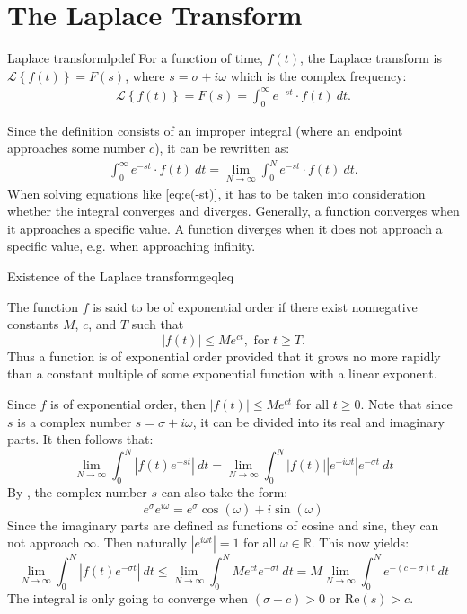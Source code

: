 \section{The Laplace Transform}
\begin{definition}{Laplace transform}{lpdef}
For a function of time, $f(t)$, the Laplace transform is $\mathcal{L}\left\{ f(t)\right\} = F(s)$, where $s = \sigma + i\omega$ which is the complex frequency:
\begin{align}
\mathcal{L} \left\{f(t) \right\}=F(s)=\int_{0}^{\infty} e^{-st}\cdot f(t)\ dt.
\end{align}
\end{definition}
\noindent Since the definition consists of an improper integral (where an endpoint approaches some number $c$), it can be rewritten as:
\begin{align}
\int_{0}^{\infty} e^{-st}\cdot f(t)\ dt = \lim_{N \to \infty} \int_{0}^{N} e^{-st}\cdot f(t)\ dt. \label{eq:e(-st)}
\end{align}
When solving equations like \eqref{eq:e(-st)}, it has to be taken into consideration whether the integral converges and diverges. Generally, a function converges when it approaches a specific value. A function diverges when it does not approach a specific value, e.g. when approaching infinity.

\begin{theorem}{Existence of the Laplace transform}{geqleq}

The function $f$ is said to be of exponential order if there exist nonnegative constants $M$, $c$, and $T$  such that $$|f(t)| \leq Me^{ct},    \text{   for } t \geq T.$$
Thus a function is of exponential order provided that it grows no more rapidly than a constant multiple of some exponential function with a linear exponent. \cite[p. 320]{diffandcomplex}
\end{theorem}
\begin{prof}{}{}
Since $f$ is of exponential order, then $|f(t)| \leq Me^{ct}$ for all $t \geq 0$. Note that since $s$ is a complex number  $s=\sigma+i\omega$, it can be divided into its real and imaginary parts. It then follows that: $$\lim_{N \to \infty} \int_{0}^{N} |f(t)e^{-st}|\ dt = \lim_{N \to \infty} \int_{0}^{N} |f(t)| |e^{-i\omega t}|e^{-\sigma t}\ dt$$
By , the complex number $s$ can also take the form: 
$$e^{\sigma}e^{i\omega}= e^{\sigma}\cos(\omega)+i\sin(\omega)$$
Since the imaginary parts are defined as functions of cosine and sine, they can not approach $\infty$. Then naturally $|e^{i\omega t}|=1$ for all $\omega \in \mathbb{R}$. This now yields: $$\lim_{N \to \infty} \int_{0}^{N} |f(t)e^{-\sigma t}|\ dt \leq \lim_{N \to \infty} \int_{0}^{N} Me^{ct}e^{-\sigma t}\ dt = M \lim_{N \to \infty} \int_{0}^{N}e^{-(c-\sigma)t}\ dt $$ The integral is only going to converge when $(\sigma -c)>0$ or Re$(s)>c$.
\end{prof}


